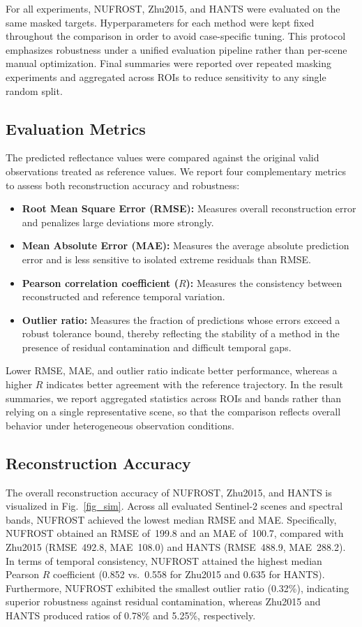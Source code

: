 \documentclass[letterpaper,journal]{IEEEtran}
\begin{document}
For all experiments, NUFROST, Zhu2015, and HANTS were evaluated on the same masked targets. Hyperparameters for each method were kept fixed throughout the comparison in order to avoid case-specific tuning. This protocol emphasizes robustness under a unified evaluation pipeline rather than per-scene manual optimization. Final summaries were reported over repeated masking experiments and aggregated across ROIs to reduce sensitivity to any single random split.



\subsection{Evaluation Metrics}
The predicted reflectance values were compared against the original valid observations treated as reference values. We report four complementary metrics to assess both reconstruction accuracy and robustness:
\begin{itemize}
    \item \textbf{Root Mean Square Error (RMSE):} Measures overall reconstruction error and penalizes large deviations more strongly.
    \item \textbf{Mean Absolute Error (MAE):} Measures the average absolute prediction error and is less sensitive to isolated extreme residuals than RMSE.
    \item \textbf{Pearson correlation coefficient ($R$):} Measures the consistency between reconstructed and reference temporal variation.
    \item \textbf{Outlier ratio:} Measures the fraction of predictions whose errors exceed a robust tolerance bound, thereby reflecting the stability of a method in the presence of residual contamination and difficult temporal gaps.
\end{itemize}

Lower RMSE, MAE, and outlier ratio indicate better performance, whereas a higher $R$ indicates better agreement with the reference trajectory. In the result summaries, we report aggregated statistics across ROIs and bands rather than relying on a single representative scene, so that the comparison reflects overall behavior under heterogeneous observation conditions.

\subsection{Reconstruction Accuracy}

The overall reconstruction accuracy of NUFROST, Zhu2015, and HANTS is visualized in Fig.~\ref{fig_sim}. Across all evaluated Sentinel-2 scenes and spectral bands, NUFROST achieved the lowest median RMSE and MAE. Specifically, NUFROST obtained an RMSE of~199.8 and an MAE of~100.7, compared with Zhu2015 (RMSE~492.8, MAE~108.0) and HANTS (RMSE~488.9, MAE~288.2). In terms of temporal consistency, NUFROST attained the highest median Pearson $R$ coefficient (0.852 vs.\ 0.558 for Zhu2015 and 0.635 for HANTS). Furthermore, NUFROST exhibited the smallest outlier ratio (0.32\%), indicating superior robustness against residual contamination, whereas Zhu2015 and HANTS produced ratios of 0.78\% and 5.25\%, respectively.
\end{document}
